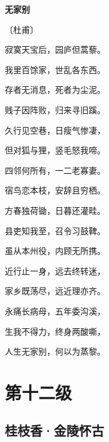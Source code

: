 \documentclass[12pt,UTF-8,openany,fontset=none]{ctexbook}
\begin{document}

\begin{center}
    {\bfseries 无家别}

    \vspace{18pt}

    \begin{large}\xuwen
        〔杜甫〕
    \end{large}

\end{center}

    \vspace{18pt}  %

\begin{center}
    \begin{Large}

        寂寞天宝后，园庐但蒿藜。

        我里百馀家，世乱各东西。

        存者无消息，死者为尘泥。

        贱子因阵败，归来寻旧蹊。

        久行见空巷，日瘦气惨凄，

        但对狐与狸，竖毛怒我啼。

        四邻何所有，一二老寡妻。

        宿鸟恋本枝，安辞且穷栖。

        方春独荷锄，日暮还灌畦。

        县吏知我至，召令习鼓鞞。

        虽从本州役，内顾无所携。

        近行止一身，远去终转迷，

        家乡既荡尽，远近理亦齐。

        永痛长病母，五年委沟溪，

        生我不得力，终身两酸嘶，

        人生无家别，何以为蒸黎。

    \end{Large}

\end{center}

\vspace{8pt}
\clearpage

\chapter{第十二级}
\clearpage

\section{桂枝香·金陵怀古}
\end{document}
